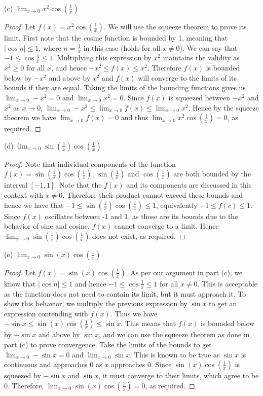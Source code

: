 \documentclass[12pt]{article}
\newcommand{\limit}[1]{\displaystyle \lim_{ {#1} }}
\newcommand{\abs}[1]{\left| {#1} \right|}
\newcommand{\paren}[1]{\left( {#1} \right)}
\begin{document}
\noindent (c) $\limit{x\to0}x^2\cos\paren{\frac{1}{x}}$

\begin{proof}
	Let $f(x)=x^2\cos\paren{\frac{1}{x}}$. We will use the squeeze theorem to prove its limit. First note that the cosine function is bounded by 1, meaning that $\abs{\cos n}\le 1$, where $n=\frac{1}{x}$ in this case (holds for all $x\neq0$). We can say that $-1\le\cos\frac{1}{x}\le1$. Multiplying this expression by $x^2$ maintains the validity as $x^2\ge0$ for all $x$, and hence $-x^2\le f(x)\le x^2$. Therefore $f(x)$ is bounded below by $-x^2$ and above by $x^2$ and $f(x)$ will converge to the limits of its bounds if they are equal. Taking the limits of the bounding functions gives us $\limit{x\to0}-x^2=0$ and $\limit{x\to0}x^2=0$. Since $f(x)$ is squeezed between $-x^2$ and $x^2$ as $x\to0$, $\limit{x\to0}-x^2\le \limit{x\to0} f(x)\le \limit{x\to0} x^2$. Hence by the squeeze theorem we have $\limit{x\to0} f(x)=0$ and thus $\limit{x\to0} x^2\cos\paren{\frac{1}{x}}=0$, as required.
\end{proof}

\noindent (d) $\limit{x\to0}\sin\paren{\frac{1}{x}}\cos\paren{\frac{1}{x}}$

\begin{proof}
	Note that individual components of the function $f(x)=\sin\paren{\frac{1}{x}}\cos\paren{\frac{1}{x}}$, $\sin\paren{\frac{1}{x}}$ and $\cos\paren{\frac{1}{x}}$ are both bounded by the interval $[-1,1]$. Note that the $f(x)$ and its components are discussed in this context with $x\neq0$. Therefore their product cannot exceed these bounds and hence we have that $-1\le\sin\paren{\frac{1}{x}}\cos\paren{\frac{1}{x}}\le1$, equivalently $-1\le f(c)\le 1$. Since $f(x)$ oscillates between -1 and 1, as those are its bounds due to the behavior of sine and cosine, $f(x)$ cannot converge to a limit. Hence $\limit{x\to0}\sin\paren{\frac{1}{x}}\cos\paren{\frac{1}{x}}$ does not exist, as required.
\end{proof}

\noindent (e) $\limit{x\to 0}\sin\paren{x}\cos\paren{\frac{1}{x}}$

\begin{proof}
	Let $f(x)=\sin\paren{x}\cos\paren{\frac{1}{x}}$. As per our argument in part (c), we know that  $\abs{\cos n}\le 1$ and hence $-1\le\cos\frac{1}{x}\le1$ for all $x\neq{0}$. This is acceptable as the function does not need to contain its limit, but it must approach it. To show this behavior, we multiply the previous expression by $\sin x$ to get an expression contending with $f(x)$. Thus we have $-\sin x\le\sin\paren{x}\cos\paren{\frac{1}{x}}\le\sin x$. This means that $f(x)$ is bounded below by $-\sin x$ and above by $\sin x$, and we can use the squeeze theorem as done in part (c) to prove convergence. Take the limits of the bounds to get $\limit{x\to0}-\sin x=0$ and $\limit{x\to0}\sin x$. This is known to be true as $\sin x$ is continuous and approaches 0 as $x$ approaches 0. Since $\sin\paren{x}\cos\paren{\frac{1}{x}}$ is squeezed by $-\sin x$ and $\sin x$, it must converge to their limits, which agree to be 0. Therefore, $\limit{x\to 0}\sin\paren{x}\cos\paren{\frac{1}{x}}=0$, as required.
\end{proof}
\end{document}
